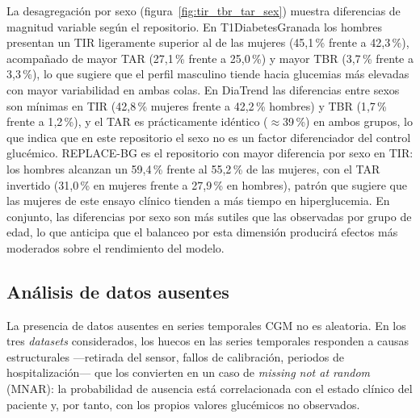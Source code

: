 La desagregación por sexo (figura~\ref{fig:tir_tbr_tar_sex}) muestra diferencias
de magnitud variable según el repositorio.
En T1DiabetesGranada los hombres presentan un TIR ligeramente superior al de las
mujeres (45{,}1\,\% frente a 42{,}3\,\%), acompañado de mayor TAR (27{,}1\,\%
frente a 25{,}0\,\%) y mayor TBR (3{,}7\,\% frente a 3{,}3\,\%), lo que sugiere
que el perfil masculino tiende hacia glucemias más elevadas con mayor variabilidad
en ambas colas.
En DiaTrend las diferencias entre sexos son mínimas en TIR (42{,}8\,\% mujeres
frente a 42{,}2\,\% hombres) y TBR (1{,}7\,\% frente a 1{,}2\,\%), y el TAR es
prácticamente idéntico ($\approx$39\,\%) en ambos grupos, lo que indica que en
este repositorio el sexo no es un factor diferenciador del control glucémico.
REPLACE-BG es el repositorio con mayor diferencia por sexo en TIR: los hombres
alcanzan un 59{,}4\,\% frente al 55{,}2\,\% de las mujeres, con el TAR invertido
(31{,}0\,\% en mujeres frente a 27{,}9\,\% en hombres), patrón que sugiere que
las mujeres de este ensayo clínico tienden a más tiempo en hiperglucemia. En
conjunto, las diferencias por sexo son más sutiles que las observadas por grupo de
edad, lo que anticipa que el balanceo por esta dimensión producirá efectos más
moderados sobre el rendimiento del modelo.
\subsection{Análisis de datos ausentes}
\label{subsec:eda_missing}


La presencia de datos ausentes en series temporales CGM no es aleatoria. En los tres \textit{datasets} considerados, los huecos en las series temporales responden a causas estructurales ---retirada del sensor, fallos de calibración, periodos de hospitalización--- que los convierten en un caso de \textit{missing not at random} (MNAR): la probabilidad de ausencia está correlacionada con el estado clínico del paciente y, por tanto, con los propios valores glucémicos no observados.


